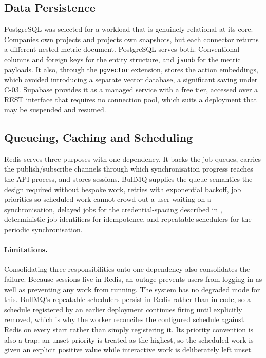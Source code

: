 \subsection{Data Persistence}
\label{subsec:tool-database}

PostgreSQL was selected for a workload that is genuinely relational at its core. Companies own projects and projects own snapshots, but each connector returns a different nested metric document. PostgreSQL serves both. Conventional columns and foreign keys for the entity structure, and \texttt{jsonb} for the metric payloads. It also, through the \texttt{pgvector} extension, stores the action embeddings, which avoided introducing a separate vector database, a significant saving under C-03. Supabase provides it as a managed service with a free tier, accessed over a REST interface that requires no connection pool, which suits a deployment that may be suspended and resumed.


\subsection{Queueing, Caching and Scheduling}
\label{subsec:tool-queue}

Redis serves three purposes with one dependency. It backs the job queues, carries
the publish/subscribe channels through which synchronisation progress reaches the
API process, and stores sessions. BullMQ supplies the queue semantics the design
required without bespoke work, retries with exponential backoff, job priorities so
scheduled work cannot crowd out a user waiting on a synchronisation, delayed jobs
for the credential-spacing described in ,
deterministic job identifiers for idempotence, and repeatable schedulers for the
periodic synchronisation.

\paragraph{Limitations.}
Consolidating three responsibilities onto one dependency also consolidates the
failure. Because sessions live in Redis, an outage prevents users from logging in
as well as preventing any work from running. The system has no degraded mode for
this. BullMQ's repeatable schedulers persist in Redis rather than in code, so a
schedule registered by an earlier deployment continues firing until explicitly
removed, which is why the worker reconciles the configured schedule against
Redis on every start rather than simply registering it. Its priority convention
is also a trap: an unset priority is treated as the highest, so the scheduled
work is given an explicit positive value while interactive work is deliberately
left unset.

